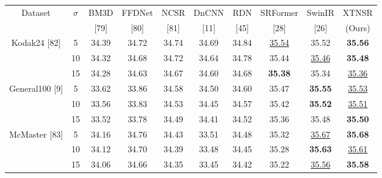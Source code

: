 \documentclass[twocolumn]{svjour3}          %
\begin{document}
\begin{table}
\begin{tabular}{|c|c|c|c|c|c|c|c|c|c|}
\hline
\multirow{2}{*}{Dataset} & \multirow{2}{*}{$\sigma$} & BM3D & FFDNet & NCSR & DnCNN & RDN & SRFormer & SwinIR  & XTNSR \\ \cline{3-10} 
                         &                          & [79] & [80]  & [81]  & [11]   & [45]   & [28] & [26] & (Ours) \\ \hline
\multirow{3}{*}{Kodak24 [82]}  & 5                       & 34.39 & 34.72 & 34.74 & 34.69  & 34.84 & {\color{blue}\underline{35.54}}  & 35.52    & {\color{red}\textbf{35.56}} \\ \cline{2-10} 
                         & 10                       & 34.32 & 34.68 & 34.72 & 34.64  & 34.78  & 35.44  & {\color{blue}\underline{35.46}} & {\color{red}\textbf{35.48}} \\ \cline{2-10} 
                         & 15                       & 34.28 & 34.63 & 34.67 & 34.60  & 34.68  & {\color{red}\textbf{35.38}}  & 35.34 & {\color{blue}\underline{35.36}} \\ \hline
\multirow{3}{*}{General100 [9]}  & 5                       & 33.62 & 33.86 & 34.58 & 34.50  & 34.60  & 35.47  & {\color{red}\textbf{35.55}} & {\color{blue}\underline{35.53}} \\ \cline{2-10} 
                         & 10                       & 33.56 & 33.83 & 34.53 & 34.45  & 34.57  & 35.42 & {\color{red}\textbf{35.52}}  & {\color{blue}\underline{35.51}} \\ \cline{2-10} 
                         & 15                       & 33.52 & 33.78 & 34.49 & 34.41  & 34.52  & 35.36  & 35.48 & {\color{red}\textbf{35.50}} \\ \hline
\multirow{3}{*}{McMaster [83]} & 5                      & 34.16 & 34.76 & 34.43 & 33.51  & 34.48  & 35.32  & {\color{blue}\underline{35.67}}  & {\color{red}\textbf{35.68}} \\ \cline{2-10} 
                         & 10                       & 34.12 & 34.70 & 34.39 & 33.48  & 34.45  & 35.28  & {\color{red}\textbf{35.63}} & {\color{blue}\underline{35.61}} \\ \cline{2-10} 
                         & 15                       & 34.06 & 34.66 & 34.35 & 33.45  & 34.42  & 35.22  & {\color{blue}\underline{35.56}} & {\color{red}\textbf{35.58}} \\ \hline
\end{tabular}

\end{table}
\end{document}
